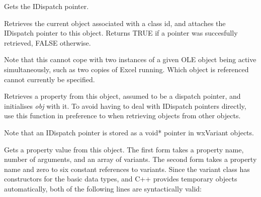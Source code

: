 
Gets the IDispatch pointer.

\label{wxautomationobjectgetinstance}


Retrieves the current object associated with a class id, and attaches the IDispatch pointer
to this object. Returns TRUE if a pointer was succesfully retrieved, FALSE otherwise.

Note that this cannot cope with two instances of a given OLE object being active simultaneously,
such as two copies of Excel running. Which object is referenced cannot currently be specified.

\label{wxautomationobjectgetobject}


Retrieves a property from this object, assumed to be a dispatch pointer, and initialises {\it obj} with it.
To avoid having to deal with IDispatch pointers directly, use this function in preference
to  when retrieving objects
from other objects.

Note that an IDispatch pointer is stored as a void* pointer in wxVariant objects.



\label{wxautomationobjectgetproperty}



Gets a property value from this object. The first form takes a property name, number of
arguments, and an array of variants. The second form takes a property name and zero to six
constant references to variants. Since the variant class has constructors for the basic
data types, and C++ provides temporary objects automatically, both of the following lines
are syntactically valid:

